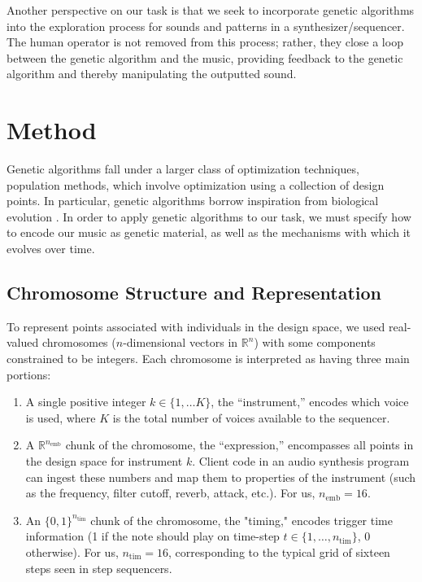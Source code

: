 \documentclass[conference]{IEEEtran}
\begin{document}
Another perspective on our task is that we seek to incorporate genetic
algorithms into the exploration process for sounds and patterns in a
synthesizer/sequencer. The human operator is not removed from this process;
rather, they close a loop between the genetic algorithm and the music,
providing feedback to the genetic algorithm and thereby manipulating the
outputted sound.

\section{Method}

Genetic algorithms fall under a larger class of optimization techniques,
population methods, which involve optimization using a collection of design
points. In particular, genetic algorithms borrow inspiration from biological
evolution \cite{genalg-textbook,textbook}. In order to apply genetic algorithms to our
task, we must specify how to encode our music as genetic material, as well as
the mechanisms with which it evolves over time.

\subsection{Chromosome Structure and Representation}

To represent points associated with individuals in the design space, we used
real-valued chromosomes ($n$-dimensional vectors in
$\mathbb{R}^n$) with some components constrained to be integers. Each
chromosome is interpreted as having three main portions:

\begin{enumerate}
    \item A single positive integer $k \in \{1, \dots K\}$, the ``instrument,'' encodes
          which voice is used, where $K$ is the total number of voices
          available to the
          sequencer.
    \item A $\mathbb{R}^{n_\text{emb}}$ chunk of the chromosome, the
          ``expression,'' encompasses all points in the design space for instrument
          $k$.
          Client code in an audio synthesis program can ingest these numbers and map them
          to properties of the instrument (such as the frequency, filter cutoff, reverb,
          attack, etc.). For us, $n_\text{emb} = 16$.
    \item An $\{0, 1\}^{n_\text{tim}}$ chunk of the chromosome, the "timing," encodes trigger
          time information (1 if the note should play on time-step $t \in \{1, \dots, n_\text{tim}\}$,
          0 otherwise). For us, $n_\text{tim} = 16$, corresponding to the typical grid
          of
          sixteen steps seen in step sequencers.
\end{enumerate}
\end{document}
